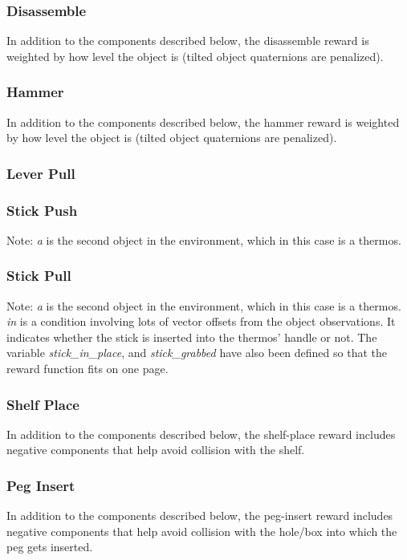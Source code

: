 {\subsubsection{Disassemble}
In addition to the components described below, the disassemble reward is weighted by how level the object is (tilted object quaternions are penalized).



\subsubsection{Hammer}
In addition to the components described below, the hammer reward is weighted by how level the object is (tilted object quaternions are penalized).



\subsubsection{Lever Pull}



\subsubsection{Stick Push}
Note: \textit{a} is the second object in the environment, which in this case is a thermos.


\subsubsection{Stick Pull}
Note: \textit{a} is the second object in the environment, which in this case is a thermos.
\textit{in} is a condition involving lots of vector offsets from the object observations. It indicates whether the stick is inserted into the thermos' handle or not. The variable \textit{stick\_in\_place}, and \textit{stick\_grabbed} have also been defined so that the reward function fits on one page.







\subsubsection{Shelf Place}
In addition to the components described below, the shelf-place reward includes negative components that help avoid collision with the shelf.



\subsubsection{Peg Insert}
In addition to the components described below, the peg-insert reward includes negative components that help avoid collision with the hole/box into which the peg gets inserted.



}
